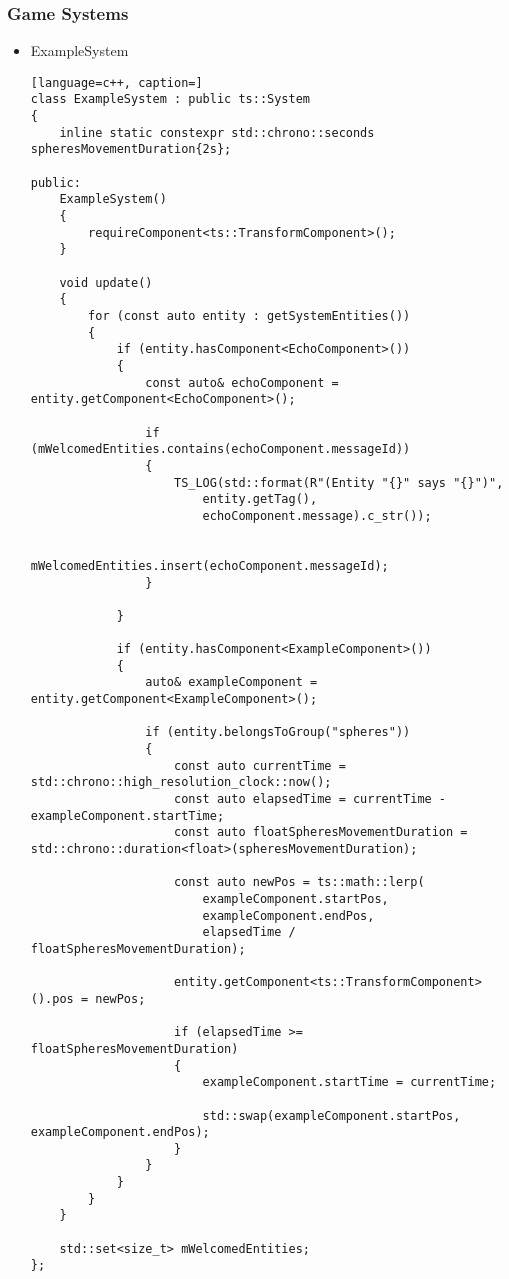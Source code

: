 \subsubsection{Game Systems}
\begin{itemize}
    \item ExampleSystem
    \label{sec:example_system}
\begin{lstlisting}[language=c++, caption=]
class ExampleSystem : public ts::System
{
    inline static constexpr std::chrono::seconds spheresMovementDuration{2s};

public:
    ExampleSystem()
    {
        requireComponent<ts::TransformComponent>();
    }

    void update()
    {
        for (const auto entity : getSystemEntities())
        {
            if (entity.hasComponent<EchoComponent>())
            {
                const auto& echoComponent = entity.getComponent<EchoComponent>();

                if (mWelcomedEntities.contains(echoComponent.messageId))
                {
                    TS_LOG(std::format(R"(Entity "{}" says "{}")",
                        entity.getTag(),
                        echoComponent.message).c_str());

                    mWelcomedEntities.insert(echoComponent.messageId);
                }

            }

            if (entity.hasComponent<ExampleComponent>())
            {
                auto& exampleComponent = entity.getComponent<ExampleComponent>();

                if (entity.belongsToGroup("spheres"))
                {
                    const auto currentTime = std::chrono::high_resolution_clock::now();
                    const auto elapsedTime = currentTime - exampleComponent.startTime;
                    const auto floatSpheresMovementDuration = std::chrono::duration<float>(spheresMovementDuration);

                    const auto newPos = ts::math::lerp(
                        exampleComponent.startPos,
                        exampleComponent.endPos,
                        elapsedTime / floatSpheresMovementDuration);

                    entity.getComponent<ts::TransformComponent>().pos = newPos;

                    if (elapsedTime >= floatSpheresMovementDuration)
                    {
                        exampleComponent.startTime = currentTime;

                        std::swap(exampleComponent.startPos, exampleComponent.endPos);
                    }
                }
            }
        }
    }

    std::set<size_t> mWelcomedEntities;
};
\end{lstlisting}
\end{itemize}

